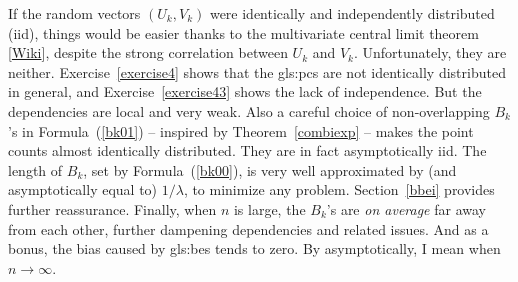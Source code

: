 \documentclass[10pt]{article}
\begin{document}
\begin{Exercise}
If the random vectors $(U_k,V_k)$ were identically and independently distributed (iid), things would be easier thanks to
 the \textcolor{index}{multivariate central limit theorem} [\href{https://en.wikipedia.org/wiki/Central_limit_theorem#Multidimensional_CLT}{Wiki}], despite the strong correlation between $U_k$ and $V_k$. Unfortunately, they are neither. Exercise~\ref{exercise4} shows that the 
\glspl{gls:pc} are not identically distributed in general, and Exercise~\ref{exercise43} shows the lack of independence. But the dependencies are local and very weak.
Also a careful choice of non-overlapping $B_k$'s in Formula~(\ref{bk01}) -- inspired by Theorem~\ref{combiexp} -- makes the point counts  almost identically distributed. 
They are in fact asymptotically iid. The length of $B_k$, set by Formula~(\ref{bk00}), is very well approximated by (and asymptotically equal to) $1/\lambda$, to minimize any problem. 
Section~\ref{bbei} provides further reassurance. Finally, when $n$ is large, the $B_k$'s are {\em on average} far away from each other, further dampening dependencies and related issues. And as a bonus,
the bias caused by \glspl{gls:be} tends to zero.  By asymptotically, I mean when $n\rightarrow\infty$.


\end{Exercise}
\end{document}
